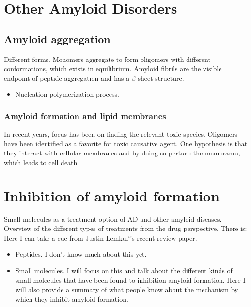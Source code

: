 \section{Other Amyloid Disorders}

\subsection{Amyloid aggregation}

Different forms. Monomers aggregate to form oligomers with different conformations, which exists in equilibrium.  Amyloid fibrils are the visible endpoint of peptide aggregation and has a $\beta$-sheet structure.

\begin{itemize}
  \item Nucleation-polymerization process.
\end{itemize}

\subsubsection{Amyloid formation and lipid membranes}
In recent years, focus has been on finding the relevant toxic species. Oligomers have been identified as a favorite for toxic causative agent.  One hypothesis is that they interact with cellular membranes and by doing so perturb the membranes, which leads to cell death.

\section{Inhibition of amyloid formation}
Small molecules as a treatment option of AD and other amyloid diseases.  Overview of the different types of treatments from the drug perspective.  There is:
Here I can take a cue from Justin Lemkul`'s recent review paper.
\begin{itemize}
  \item Peptides. I don't know much about this yet.
  \item Small molecules.  I will focus on this and talk about the different kinds of small molecules that have been found to inhibition amyloid formation.  Here I will also provide a summary of what people know about the mechanism by which they inhibit amyloid formation.
\end{itemize}

